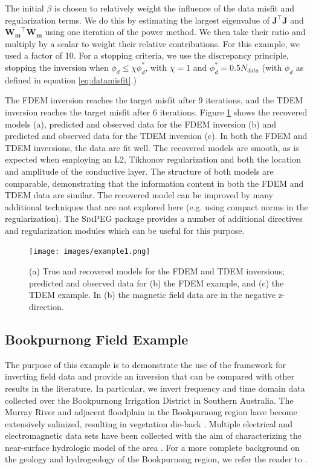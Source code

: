 \documentclass[preprint,review,3p,times,onecolumn,authoryear]{elsarticle}
\newcommand{\SimPEG}{\textsc{SimPEG}\xspace}
\begin{document}
The initial $\beta$ is chosen to relatively weight the influence of the data
misfit and regularization terms. We do this by estimating the largest
eigenvalue of $\mathbf{J}^{\top}\mathbf{J}$ and
$\mathbf{W_m}^{\top}\mathbf{W_m}$ using one iteration of the power method.
We then take their ratio and multiply by a scalar to weight their relative
contributions. For this example, we used a factor of 10. For a stopping
criteria, we use the discrepancy principle, stopping the inversion when
$\phi_d \leq \chi \phi_d^*$, with $\chi = 1$ and $\phi_d^* = 0.5 N_{data}$
(with $\phi_d$ as defined in equation \ref{eq:datamisfit}.)

The FDEM inversion reaches the target misfit after 9 iterations, and the TDEM
inversion reaches the target misfit after 6 iterations.  Figure
\ref{fig:example1Results} shows the recovered models (a), predicted and
observed data for the FDEM inversion (b) and predicted and observed data for
the TDEM inversion (c). In both the FDEM and TDEM inversions, the data are fit
well. The recovered models are smooth, as is expected when employing an L2,
Tikhonov regularization and both the location and amplitude of the
conductive layer. The structure of both models are comparable, demonstrating
that the information content in both the FDEM and TDEM data are similar. The
recovered model can be improved by many additional techniques that are not
explored here (e.g. using compact norms in the regularization). The \SimPEG
package provides a number of additional directives and regularization modules
which can be useful for this purpose.


{%
\begin{figure}[htb!]
    \centering
    \texttt{[image: images/example1.png]}
\caption{(a) True and recovered models for the FDEM and TDEM inversions; predicted and observed data for (b) the FDEM example, and (c) the TDEM example. In (b) the magnetic field data are in the negative z-direction.}
\label{fig:example1Results}
\end{figure}
}


\subsection{Bookpurnong Field Example}
\label{sec:BookpurnongFieldExample}

The purpose of this example is to demonstrate the use of the framework for
inverting field data and provide an inversion that can be compared with other
results in the literature. In particular, we invert frequency and time domain
data collected over the Bookpurnong Irrigation District in Southern Australia.
The Murray River and adjacent floodplain in the Bookpurnong region have become
extensively salinized, resulting in vegetation die-back \citep{Munday2006,
Overton2004}. Multiple electrical and electromagnetic data sets have been
collected with the aim of characterizing the near-surface hydrologic model of
the area \citep{Munday2006}. For a more complete background on the geology and
hydrogeology of the Bookpurnong region, we refer the reader to
\cite{Munday2006}.
\end{document}
